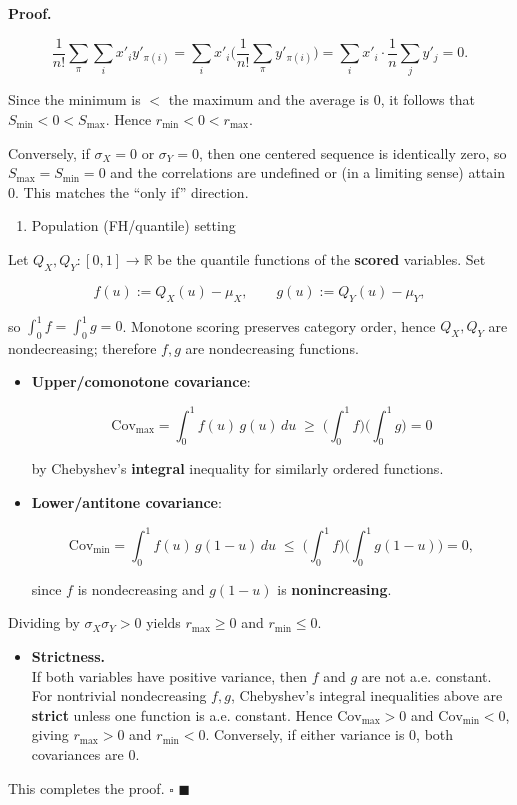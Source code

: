 \documentclass[
  12pt,
]{article}
\providecommand{\tightlist}{%
  \setlength{\itemsep}{0pt}\setlength{\parskip}{0pt}}
\theoremstyle{plain}
\theoremstyle{definition}
\renewenvironment{proof}
   {\par\noindent\textbf{Proof.}\ }
   {\hfill$\blacksquare$\par}
\theoremstyle{remark}
\begin{document}
\begin{proof}
\begin{itemize}
  \[\frac1{n!}\sum_{\pi}\sum_i x'_i y'_{\pi(i)}  
    = \sum_i x'_i \Big(\frac1{n!}\sum_{\pi} y'_{\pi(i)}\Big)  
    = \sum_i x'_i \cdot \frac1n\sum_j y'_j  
    = 0.\]

  Since the minimum is \(<\) the maximum and the average is \(0\), it
  follows that \(S_{\min}<0<S_{\max}\). Hence \(r_{\min}<0<r_{\max}\).

  Conversely, if \(\sigma_X=0\) or \(\sigma_Y=0\), then one centered
  sequence is identically zero, so \(S_{\max}=S_{\min}=0\) and the
  correlations are undefined or (in a limiting sense) attain 0. This
  matches the ``only if'' direction.
\end{itemize}

\begin{enumerate}
\def\labelenumi{\Alph{enumi})}
\setcounter{enumi}{1}
\tightlist
\item
  Population (FH/quantile) setting
\end{enumerate}

Let \(Q_X, Q_Y : [0,1]\to\mathbb{R}\) be the quantile functions of the
\textbf{scored} variables. Set

\[f(u):=Q_X(u)-\mu_X,\qquad g(u):=Q_Y(u)-\mu_Y,\]

so \(\int_0^1 f=\int_0^1 g=0\). Monotone scoring preserves category
order, hence \(Q_X, Q_Y\) are nondecreasing; therefore \(f, g\) are
nondecreasing functions.

\begin{itemize}
\item
  \textbf{Upper/comonotone covariance}:

  \[\mathrm{Cov}_{\max}=\int_0^1 f(u)\,g(u)\,du \;\ge\; \Big(\int_0^1 f\Big)\Big(\int_0^1 g\Big)=0\]

  by Chebyshev's \textbf{integral} inequality for similarly ordered
  functions.
\item
  \textbf{Lower/antitone covariance}:

  \[\mathrm{Cov}_{\min}=\int_0^1 f(u)\,g(1-u)\,du \;\le\; \Big(\int_0^1 f\Big)\Big(\int_0^1 g(1-u)\Big)=0,\]

  since \(f\) is nondecreasing and \(g(1-u)\) is \textbf{nonincreasing}.
\end{itemize}

Dividing by \(\sigma_X\sigma_Y>0\) yields \(r_{\max}\ge 0\) and
\(r_{\min}\le 0\).

\begin{itemize}
\tightlist
\item
  \textbf{Strictness.}\\
  If both variables have positive variance, then \(f\) and \(g\) are not
  a.e. constant. For nontrivial nondecreasing \(f,g\), Chebyshev's
  integral inequalities above are \textbf{strict} unless one function is
  a.e. constant. Hence \(\mathrm{Cov}_{\max}>0\) and
  \(\mathrm{Cov}_{\min}<0\), giving \(r_{\max}>0\) and \(r_{\min}<0\).
  Conversely, if either variance is \(0\), both covariances are \(0\).
\end{itemize}

This completes the proof. \(\square\)
\end{proof}
\end{document}
